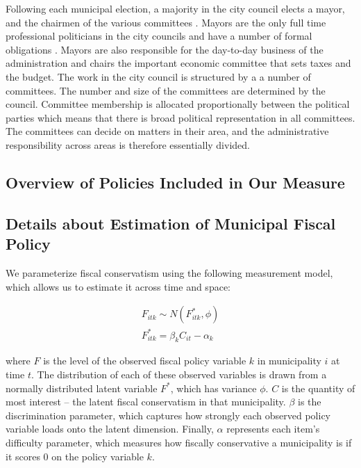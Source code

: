 \documentclass[a4paper,12pt]{article}
\begin{document}
Following each municipal election, a majority in the city council elects a mayor, and the chairmen of the various committees \citep{serritzlew2008explaining}. Mayors are the only full time professional politicians in the city councils and have a number of formal obligations \citep{kjaer2015urban}. Mayors are also responsible for the day-to-day business of the administration and chairs the important economic committee that sets taxes and the budget. The work in the city council is structured by a a number of committees. The number and size of the committees are determined by the council. Committee membership is allocated proportionally between the political parties which means that there is broad political representation in all committees. The committees can decide on matters in their area, and the administrative responsibility across areas is therefore essentially divided. 

\clearpage

\subsection{Overview of Policies Included in Our Measure} \label{policy}


\setcounter{table}{0}
\setcounter{figure}{0}



\clearpage

\subsection{Details about Estimation of Municipal Fiscal Policy} \label{estimation}

\setcounter{table}{0}
\setcounter{figure}{0}

We parameterize fiscal conservatism using the following measurement model, which allows us to estimate it across time and space:

\begin{gather*}
F_{itk} \sim N(F^*_{itk}, \phi)\\
F^*_{itk} = \beta_k C_{it} - \alpha_{k}
\end{gather*}

where $F$ is the level of the observed fiscal policy variable $k$ in municipality $i$ at time $t$. The distribution of each of these observed variables is drawn from a normally distributed latent variable $F^*$, which has variance $\phi$. $C$ is the quantity of most interest -- the latent fiscal conservatism in that municipality. $\beta$ is the discrimination parameter, which captures how strongly each observed policy variable loads onto the latent dimension. Finally, $\alpha$ represents each item's difficulty parameter, which measures how fiscally conservative a municipality is if it scores 0 on the policy variable $k$.
\end{document}
